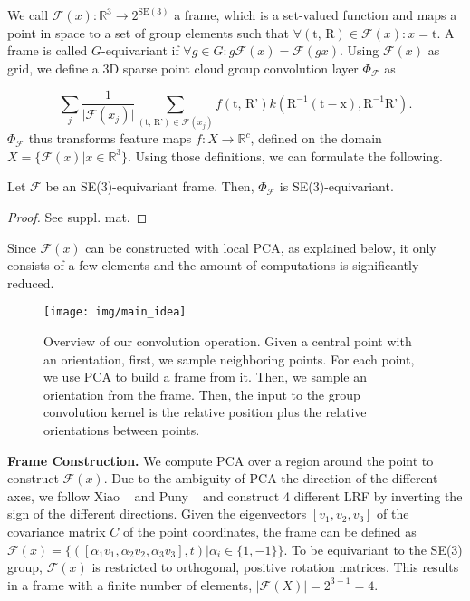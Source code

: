 We call $\mathcal{F}(x):\mathbb{R}^3 \rightarrow 2^{\text{SE}(3)}$ a frame, which is a set-valued function and maps a point in space to a set of group elements such that $\forall (\text{t, R}) \in \mathcal{F}(x): x = \text{t}$. A frame is called $G$-equivariant if $\forall g \in G: g\mathcal{F}(x) = \mathcal{F}(gx)$. Using $\mathcal{F}(x)$ as grid, we define a 3D sparse point cloud group convolution layer $\Phi_{\mathcal{F}}$ as

\begin{equation}
    \sum_{j} \frac{1}{\lvert \mathcal{F}(x_j) \rvert}\sum_{(\text{t, R'})\in \mathcal{F}(x_j)}  f(\text{t, R'})k(\text{R}^{-1}(\text{t} - \text{x}), \text{R}^{-1}\text{R'}).
    \label{eq:loco-roto-conv}
\end{equation}
$\Phi_{\mathcal{F}}$ thus transforms feature maps $f: X \rightarrow \mathbb{R}^c$, defined on the domain $X = \{\mathcal{F}(x)|x\in \mathbb{R}^3\}$.
Using those definitions, we can formulate the following.
\begin{theorem}
    Let $\mathcal{F}$ be an SE(3)-equivariant frame. Then, $\Phi_{\mathcal{F}}$ is SE(3)-equivariant. 
    \label{theorem}
\end{theorem}
\begin{proof}
    See suppl. mat.
\end{proof}

Since $\mathcal{F}(x)$ can be constructed with local PCA, as explained below, it only consists of a few elements and the amount of computations is significantly reduced.%






\begin{figure}[t]
    \centering
    \texttt{[image: img/main\_idea]}
    \caption{
    Overview of our convolution operation. 
    Given a central point with an orientation, 
    first, we sample neighboring points. 
    For each point, we use PCA to build a frame from it.
    Then, we sample an orientation from the frame.
    Then, the input to the group convolution kernel is the relative position plus the relative orientations between points.}
    \label{fig:main_idea}
\end{figure}












\textbf{Frame Construction.}
We compute PCA over a region around the point to construct $\mathcal{F}(x)$.
Due to the ambiguity of PCA \wrt the direction of the different axes, we follow Xiao \etal~\cite{xiao2020pca} and Puny \etal~\cite{puny2022frame} and construct 4 different \ac{LRF} by inverting the sign of the different directions.
Given the eigenvectors $[v_1, v_2, v_3]$ of the covariance matrix $C$ of the point coordinates, the frame can be defined as $\mathcal{F}(x) = \{ ( [ \alpha_1 v_1, \alpha_2 v_2, \alpha_3 v_3], t ) | \alpha_i \in \{1, -1\}\}$.
To be equivariant to the SE(3) group, $\mathcal{F}(x)$ is restricted to orthogonal, positive rotation matrices.
This results in a frame with a finite number of elements, $| \mathcal{F} (X) | = 2^{3-1} = 4$.


